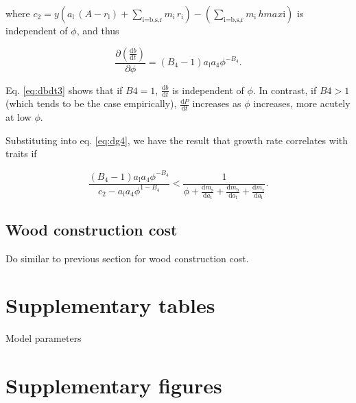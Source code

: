 \documentclass[12pt, a4paper]{article}
\begin{document}
\begin{appendices}
where
$c_2 = y ( a_\textrm{l} \, (A - r_\textrm{l}) + \sum_\textrm{i=b,s,r}{m_\textrm{i} \, r_\textrm{i}}) - (\sum_\textrm{i=b,s,r}{m_\textrm{i} \, hmax\textrm{i}})$
is independent of $\phi$, and thus

\begin{equation}\label{eq:dbdt3}
\frac{\partial \left( \frac{ \textrm{d}b} {\textrm{d}t}\right)}{\partial \phi}  =
(B_4-1) a_\textrm{l} a_4\phi ^{-B_4}.
\end{equation}

Eq. \ref{eq:dbdt3} shows that if $B4=1$, $\frac{ \textrm{d}b} {\textrm{d}t}$ is independent
of $\phi$. In contrast, if $B4>1$ (which tends to be the case empirically), $\frac{ \textrm
{d}P} {\textrm{d}t}$ increases as $\phi$ increases, more acutely at low $\phi$.

Substituting into eq. \ref{eq:dg4}, we have the result that growth rate correlates
with traits if

\begin{equation} \label{eq:G6}
\frac{(B_4-1) a_\textrm{l} a_4\phi ^{-B_4}}{c_2 - a_\textrm{l} a_4 \phi ^{1-B_4}}
< \frac{1}{\phi
 + \frac{\textrm{d}m_\textrm{s}}{\textrm{d}a_\textrm{l}} + \frac{\textrm{d}m_\textrm
 {b}}{\textrm{d}a_\textrm{l}} + \frac{\textrm{d}m_\textrm{r}}{\textrm{d}a_\textrm{l}}}.
\end{equation}

\subsection{Wood construction cost}

Do similar to previous section for wood construction cost.

\newpage

\section{Supplementary tables}\label{supplementary-tables}

\begin{table}[ht]
\caption{Model parameters}
\centering
{\footnotesize  %
\begin{doublespace}


\end{doublespace}
}
\label{tab:params}
\end{table}

\newpage

\section{Supplementary figures}\label{supplementary-figures}


\end{appendices}
\end{document}

